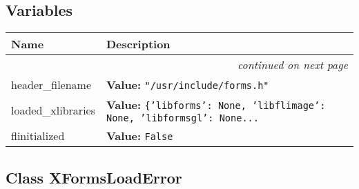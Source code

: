
  \subsection{Variables}

    \vspace{-1cm}
\hspace{\varindent}\begin{longtable}{|p{\varnamewidth}|p{\vardescrwidth}|l}
\cline{1-2}
\cline{1-2} \centering \textbf{Name} & \centering \textbf{Description}& \\
\cline{1-2}
\endhead\cline{1-2}\multicolumn{3}{r}{\small\textit{continued on next page}}\\\endfoot\cline{1-2}
\endlastfoot\raggedright h\-e\-a\-d\-e\-r\-\_\-f\-i\-l\-e\-n\-a\-m\-e\- & \raggedright \textbf{Value:} 
{\tt "/usr/include/forms.h"}&\\
\cline{1-2}
\raggedright l\-o\-a\-d\-e\-d\-\_\-x\-l\-i\-b\-r\-a\-r\-i\-e\-s\- & \raggedright \textbf{Value:} 
{\tt \{'libforms': None, 'libflimage': None, 'libformsgl': None\texttt{...}}&\\
\cline{1-2}
\raggedright f\-l\-i\-n\-i\-t\-i\-a\-l\-i\-z\-e\-d\- & \raggedright \textbf{Value:} 
{\tt False}&\\
\cline{1-2}
\end{longtable}



\subsection{Class XFormsLoadError}

